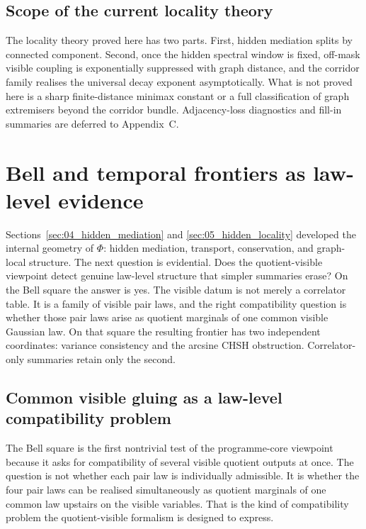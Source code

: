 \documentclass[11pt]{article}
\numberwithin{equation}{section}
\theoremstyle{thmcompact}
\theoremstyle{remark}
\begin{document}
\subsection{Scope of the current locality theory}
\label{subsec:scope-locality-theory}

The locality theory proved here has two parts. First, hidden mediation splits by connected component. Second, once the hidden spectral window is fixed, off-mask visible coupling is exponentially suppressed with graph distance, and the corridor family realises the universal decay exponent asymptotically. What is not proved here is a sharp finite-distance minimax constant or a full classification of graph extremisers beyond the corridor bundle. Adjacency-loss diagnostics and fill-in summaries are deferred to Appendix~C.

\section{Bell and temporal frontiers as law-level evidence}
\label{sec:06_bell_frontier}

Sections~\ref{sec:04_hidden_mediation} and \ref{sec:05_hidden_locality} developed the internal geometry of $\Phi$: hidden mediation, transport, conservation, and graph-local structure. The next question is evidential. Does the quotient-visible viewpoint detect genuine law-level structure that simpler summaries erase? On the Bell square the answer is yes. The visible datum is not merely a correlator table. It is a family of visible pair laws, and the right compatibility question is whether those pair laws arise as quotient marginals of one common visible Gaussian law. On that square the resulting frontier has two independent coordinates: variance consistency and the arcsine CHSH obstruction. Correlator-only summaries retain only the second.

\subsection{Common visible gluing as a law-level compatibility problem}

The Bell square is the first nontrivial test of the programme-core viewpoint because it asks for compatibility of several visible quotient outputs at once. The question is not whether each pair law is individually admissible. It is whether the four pair laws can be realised simultaneously as quotient marginals of one common law upstairs on the visible variables. That is the kind of compatibility problem the quotient-visible formalism is designed to express.
\end{document}
